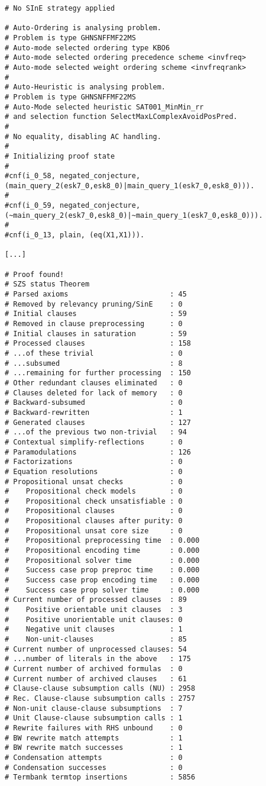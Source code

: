 \documentclass[magisterska,en]{pracamgr}
\begin{document}
\begin{lstlisting}[caption=Example partial output for E for two equivalent queries (Query 1 and Query 2)]
# No SInE strategy applied

# Auto-Ordering is analysing problem.
# Problem is type GHNSNFFMF22MS
# Auto-mode selected ordering type KBO6
# Auto-mode selected ordering precedence scheme <invfreq>
# Auto-mode selected weight ordering scheme <invfreqrank>
#
# Auto-Heuristic is analysing problem.
# Problem is type GHNSNFFMF22MS
# Auto-Mode selected heuristic SAT001_MinMin_rr
# and selection function SelectMaxLComplexAvoidPosPred.
#
# No equality, disabling AC handling.
#
# Initializing proof state
#
#cnf(i_0_58, negated_conjecture, (main_query_2(esk7_0,esk8_0)|main_query_1(esk7_0,esk8_0))).
#
#cnf(i_0_59, negated_conjecture, (~main_query_2(esk7_0,esk8_0)|~main_query_1(esk7_0,esk8_0))).
#
#cnf(i_0_13, plain, (eq(X1,X1))).

[...]

# Proof found!
# SZS status Theorem
# Parsed axioms                        : 45
# Removed by relevancy pruning/SinE    : 0
# Initial clauses                      : 59
# Removed in clause preprocessing      : 0
# Initial clauses in saturation        : 59
# Processed clauses                    : 158
# ...of these trivial                  : 0
# ...subsumed                          : 8
# ...remaining for further processing  : 150
# Other redundant clauses eliminated   : 0
# Clauses deleted for lack of memory   : 0
# Backward-subsumed                    : 0
# Backward-rewritten                   : 1
# Generated clauses                    : 127
# ...of the previous two non-trivial   : 94
# Contextual simplify-reflections      : 0
# Paramodulations                      : 126
# Factorizations                       : 0
# Equation resolutions                 : 0
# Propositional unsat checks           : 0
#    Propositional check models        : 0
#    Propositional check unsatisfiable : 0
#    Propositional clauses             : 0
#    Propositional clauses after purity: 0
#    Propositional unsat core size     : 0
#    Propositional preprocessing time  : 0.000
#    Propositional encoding time       : 0.000
#    Propositional solver time         : 0.000
#    Success case prop preproc time    : 0.000
#    Success case prop encoding time   : 0.000
#    Success case prop solver time     : 0.000
# Current number of processed clauses  : 89
#    Positive orientable unit clauses  : 3
#    Positive unorientable unit clauses: 0
#    Negative unit clauses             : 1
#    Non-unit-clauses                  : 85
# Current number of unprocessed clauses: 54
# ...number of literals in the above   : 175
# Current number of archived formulas  : 0
# Current number of archived clauses   : 61
# Clause-clause subsumption calls (NU) : 2958
# Rec. Clause-clause subsumption calls : 2757
# Non-unit clause-clause subsumptions  : 7
# Unit Clause-clause subsumption calls : 1
# Rewrite failures with RHS unbound    : 0
# BW rewrite match attempts            : 1
# BW rewrite match successes           : 1
# Condensation attempts                : 0
# Condensation successes               : 0
# Termbank termtop insertions          : 5856

\end{lstlisting}
\end{document}
